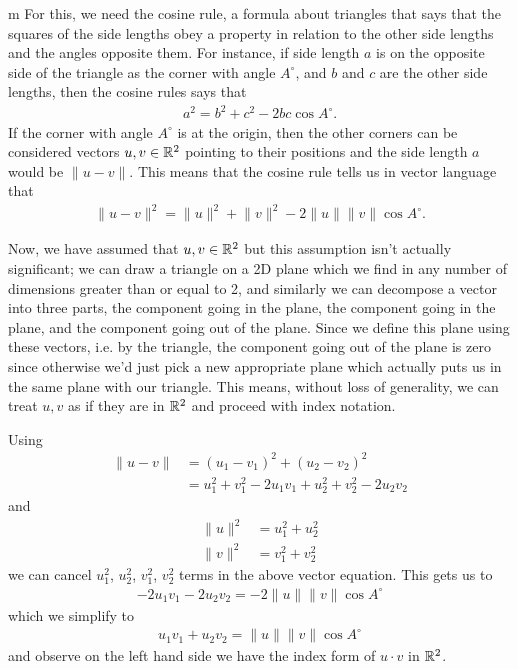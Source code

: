 \documentclass[11pt]{article}
\begin{document}
\begin{my proof}[For completeness{,} a proof that {$u\cdot v = \lVert u \rVert \lVert v \rVert \cos \theta$}]{m}
For this, we need the cosine rule, a formula about triangles that says that the squares of the side lengths obey a property in relation to the other side lengths and the angles opposite them. For instance, if side length $a$ is on the opposite side of the triangle as the corner with angle $A^\circ$, and $b$ and $c$ are the other side lengths, then the cosine rules says that \begin{gather*}
a^2 = b^2 + c^2 - 2bc \cos{A^\circ}.
\end{gather*}
If the corner with angle $A^\circ$ is at the origin, then the other corners can be considered vectors $u,v \in \mathbb{R}^2$ pointing to their positions and the side length $a$ would be $\lVert u - v \rVert$. This means that the cosine rule tells us in vector language that \begin{gather*}
\lVert u - v\rVert^2 = \lVert u \rVert^2 + \lVert v \rVert^2 - 2 \lVert u \rVert \lVert v \rVert \cos{A^\circ}.
\end{gather*}

Now, we have assumed that $u,v \in \mathbb{R}^2$ but this assumption isn't actually significant; we can draw a triangle on a 2D plane which we find in any number of dimensions greater than or equal to 2, and similarly we can decompose a vector into three parts, the component going  in the plane, the component going  in the plane, and the component going out of the plane. Since we define this plane using these vectors, i.e. by the triangle, the component going out of the plane is zero since otherwise we'd just pick a new appropriate plane which actually puts us in the same plane with our triangle. This means, without loss of generality, we can treat $u,v$ as if they are in $\mathbb{R}^2$ and proceed with index notation.

Using \begin{align*}
\lVert u - v \rVert &= (u_1 - v_1)^2 + (u_2 - v_2)^2 \\
&= u_1^2 + v_1^2 - 2u_1 v_1 + u_2^2 + v_2^2 - 2u_2 v_2
\end{align*}
and
\begin{align*}
\lVert u \rVert ^2 &= u_1^2 + u_2^2 \\
\lVert v \rVert ^2 &= v_1^2 + v_2^2 
\end{align*}
we can cancel $u_1^2$, $u_2^2$, $v_1^2$, $v_2^2$ terms in the above vector equation. This gets us to \begin{gather*}
- 2u_1 v_1 - 2u_2 v_2 = - 2 \lVert u \rVert \lVert v \rVert \cos{A^\circ}
\end{gather*}
which we simplify to \begin{gather*}
u_1 v_1 + u_2 v_2 = \lVert u \rVert \lVert v \rVert \cos{A^\circ}
\end{gather*}
and observe on the left hand side we have the index form of $u \cdot v$ in $\mathbb{R}^2$.
\end{my proof}
\end{document}
